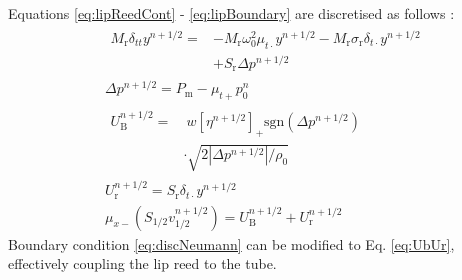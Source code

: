 Equations \eqref{eq:lipReedCont} - \eqref{eq:lipBoundary} are discretised as follows :
\def\nphSys{n+1/2}
\begin{subequations}\label{eq:discreteLipSystem}
    \begin{align}
    &\begin{aligned}
        M_\text{r}\delta_{tt}y^{\nphSys} =&-M_\text{r}\omega_0^2\mu_{t\cdot}y^{\nphSys} -M_\text{r}\sigma_\text{r}\delta_{t\cdot}y^{\nphSys}\\
        &+S_\text{r}\Delta p^{\nphSys}
    \end{aligned}\label{eq:discReed}\\
    &\Delta p^{\nphSys} = P_\text{m} - \mu_{t+}p_0^n\label{eq:pDiff}\\
    &\begin{aligned}
        U_\text{B}^{\nphSys} =&\ w[\eta^{\nphSys}]_+\text{sgn}(\Delta p^{\nphSys})\label{eq:bernoulli}\\
        &
        \cdot\sqrt{2|\Delta p^{\nphSys}|/\rho_0}
    \end{aligned}\\
    &U_\text{r}^{\nphSys}= S_\text{r}\delta_{t\cdot}y^{\nphSys}\label{eq:Ur}\\
    &\mu_{x-}(S_{1/2}v_{1/2}^{\nphSys})= U_\text{B}^{\nphSys} + U_\text{r}^{\nphSys}\label{eq:UbUr}
    \end{align}
\end{subequations}
Boundary condition \eqref{eq:discNeumann} can be modified to Eq. \eqref{eq:UbUr}, effectively coupling the lip reed to the tube. 

